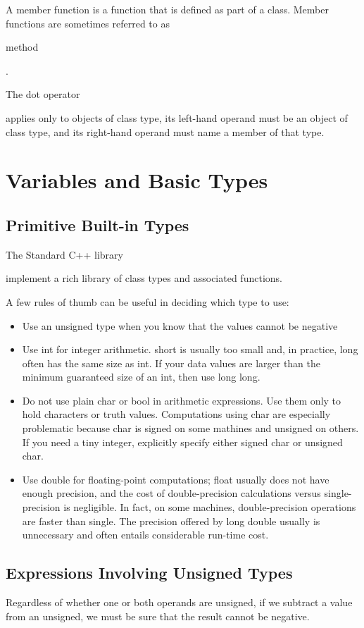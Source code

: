 \documentclass[UTF8]{ctexart}
\newcommand \qd[1] {\begin{qds} {#1} \end{qds}}
\begin{document}
A member function is a function that is  defined as part of a class. Member functions are sometimes referred to as \qd{method}.

\qd{The dot operator} applies only to objects of class type, its left-hand operand must be an object of class type, and its right-hand operand must name a member of that type.

\section{Variables and Basic Types}

\subsection{Primitive Built-in Types}
\qd{The Standard C++ library} implement a rich library of class types and associated functions.

A few rules of thumb can be useful in deciding which type to use:
\begin{itemize}
	\item{Use an unsigned type when you know that the values cannot be negative}
	\item{Use int for integer arithmetic. short is usually too small and, in practice, long often has the same size as int. If your data values are larger than the minimum guaranteed size of an int, then use long long.}
	\item{Do not use plain char or bool in arithmetic expressions. Use them only to hold characters or truth values. Computations using char are especially problematic because char is signed on some mathines and unsigned on others. If you need a tiny integer, explicitly specify either signed char or unsigned char.}
	\item{Use double for floating-point computations; float usually does not have enough precision, and the cost of double-precision calculations versus single-precision is negligible. In fact, on some machines, double-precision operations are faster than single. The precision offered by long double usually is unnecessary and often entails considerable run-time cost.}	
\end{itemize}

\subsection{Expressions Involving Unsigned Types}
Regardless of whether one or both operands are unsigned, if we subtract a value from an unsigned, we must be sure that the result cannot be negative.
\end{document}
